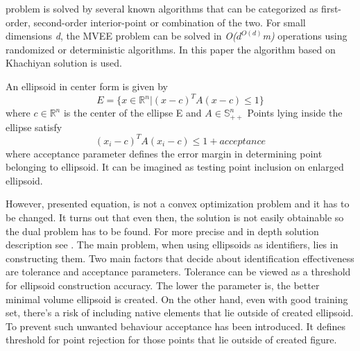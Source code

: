\documentclass{llncs}
\begin{document}
problem is solved by several known algorithms that can be categorized as first-order, second-order interior-point or combination of the two. For small dimensions \textit{d}, the MVEE problem can be solved in \textit{O($d^{O(d)}$m)} operations using randomized or deterministic algorithms\cite{MVEEMichaelTodd2005}. In this paper the algorithm based on Khachiyan solution is used.

\noindent An ellipsoid in center form is given by \[ E = \{x \in \mathbb{R}^{n} | (x - c)^{T}A(x-c) \le 1\} \] where $c \in \mathbb{R}^{n}$ is the center of the ellipse E and $ A \in \mathbb{S}^{n}_{++}$ Points lying inside the ellipse satisfy \[ (x_{i} - c)^{T}A(x_{i} - c) \le 1 + acceptance \] where acceptance parameter defines the error margin in determining point belonging to ellipsoid. It can be imagined as testing point inclusion on enlarged ellipsoid.

However, presented equation, is not a convex optimization problem and it has to be changed. It turns out that even then, the solution is not easily obtainable so the dual problem has to be found. For more precise and in depth solution description see \cite{MVEEMichaelTodd2005}. The main problem, when using ellipsoids as identifiers, lies in constructing them. Two main factors that decide about identification effectiveness are tolerance and acceptance parameters. Tolerance can be viewed as a threshold for ellipsoid construction accuracy. The lower the parameter is, the better minimal volume ellipsoid is created. On the other hand, even with good training set, there's a risk of including native elements that lie outside of created ellipsoid. To prevent such unwanted behaviour acceptance has been introduced. It defines threshold for point rejection for those points that lie outside of created figure.  

\end{document}
